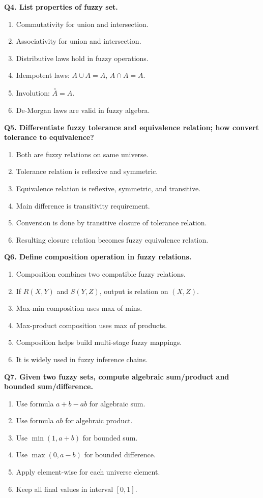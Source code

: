 \documentclass[11pt,a4paper]{article}
\begin{document}
\textbf{Q4. List properties of fuzzy set.}
\begin{enumerate}
\item Commutativity for union and intersection.
\item Associativity for union and intersection.
\item Distributive laws hold in fuzzy operations.
\item Idempotent laws: $A\cup A=A$, $A\cap A=A$.
\item Involution: $\bar{\bar A}=A$.
\item De-Morgan laws are valid in fuzzy algebra.
\end{enumerate}

\textbf{Q5. Differentiate fuzzy tolerance and equivalence relation; how convert tolerance to equivalence?}
\begin{enumerate}
\item Both are fuzzy relations on same universe.
\item Tolerance relation is reflexive and symmetric.
\item Equivalence relation is reflexive, symmetric, and transitive.
\item Main difference is transitivity requirement.
\item Conversion is done by transitive closure of tolerance relation.
\item Resulting closure relation becomes fuzzy equivalence relation.
\end{enumerate}

\textbf{Q6. Define composition operation in fuzzy relations.}
\begin{enumerate}
\item Composition combines two compatible fuzzy relations.
\item If $R(X,Y)$ and $S(Y,Z)$, output is relation on $(X,Z)$.
\item Max-min composition uses max of mins.
\item Max-product composition uses max of products.
\item Composition helps build multi-stage fuzzy mappings.
\item It is widely used in fuzzy inference chains.
\end{enumerate}

\textbf{Q7. Given two fuzzy sets, compute algebraic sum/product and bounded sum/difference.}
\begin{enumerate}
\item Use formula $a+b-ab$ for algebraic sum.
\item Use formula $ab$ for algebraic product.
\item Use $\min(1,a+b)$ for bounded sum.
\item Use $\max(0,a-b)$ for bounded difference.
\item Apply element-wise for each universe element.
\item Keep all final values in interval $[0,1]$.
\end{enumerate}
\end{document}
